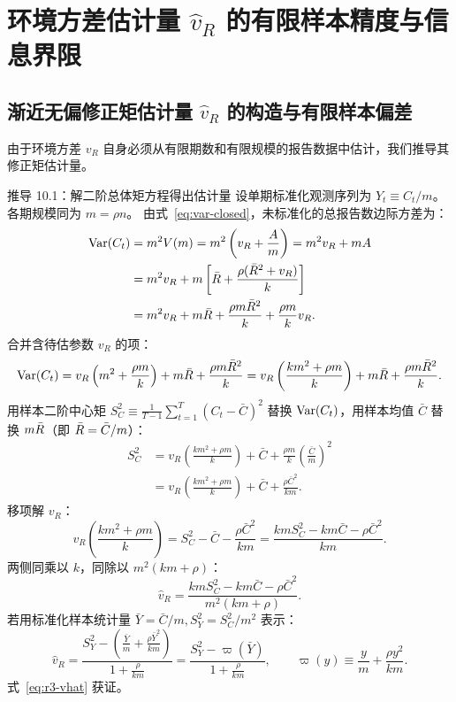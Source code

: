 \section{环境方差估计量 $\hat{v}_R$ 的有限样本精度与信息界限}
\label{sec:part10}

\subsection{渐近无偏修正矩估计量 $\hat{v}_R$ 的构造与有限样本偏差}

由于环境方差 $v_R$ 自身必须从有限期数和有限规模的报告数据中估计，我们推导其修正矩估计量。

\begin{derivationbox}{推导 10.1：解二阶总体矩方程得出估计量}
设单期标准化观测序列为 $Y_t \equiv C_t / m$。各期规模同为 $m = \rho n$。
由式~\eqref{eq:var-closed}，未标准化的总报告数边际方差为：
\begin{align}
  \mathrm{Var}(C_t) &= m^2 V(m) = m^2 \left( v_R + \frac{A}{m} \right) = m^2 v_R + m A \nonumber \\
  &= m^2 v_R + m \left[ \bar{R} + \frac{\rho(\bar{R}^2 + v_R)}{k} \right] \nonumber \\
  &= m^2 v_R + m \bar{R} + \frac{\rho m \bar{R}^2}{k} + \frac{\rho m}{k} v_R.
\end{align}
合并含待估参数 $v_R$ 的项：
\begin{equation}
  \mathrm{Var}(C_t) = v_R \left( m^2 + \frac{\rho m}{k} \right) + m \bar{R} + \frac{\rho m \bar{R}^2}{k} = v_R \left( \frac{k m^2 + \rho m}{k} \right) + m \bar{R} + \frac{\rho m \bar{R}^2}{k}.
\end{equation}
用样本二阶中心矩 $S_C^2 \equiv \frac{1}{T-1}\sum_{t=1}^T (C_t - \bar{C})^2$ 替换 $\mathrm{Var}(C_t)$，用样本均值 $\bar{C}$ 替换 $m\bar{R}$（即 $\bar{R} = \bar{C}/m$）：
\begin{align}
  S_C^2 &= v_R \left( \frac{k m^2 + \rho m}{k} \right) + \bar{C} + \frac{\rho m}{k} \left( \frac{\bar{C}}{m} \right)^2 \nonumber \\
  &= v_R \left( \frac{k m^2 + \rho m}{k} \right) + \bar{C} + \frac{\rho \bar{C}^2}{km}.
\end{align}
移项解 $v_R$：
\begin{equation}
  v_R \left( \frac{k m^2 + \rho m}{k} \right) = S_C^2 - \bar{C} - \frac{\rho \bar{C}^2}{km} = \frac{k m S_C^2 - k m \bar{C} - \rho \bar{C}^2}{km}.
\end{equation}
两侧同乘以 $k$，同除以 $m^2(km + \rho)$：
\begin{equation}
  \hat{v}_R = \frac{k m S_C^2 - k m \bar{C} - \rho \bar{C}^2}{m^2 (km + \rho)}.
  \label{eq:vhat-raw}
\end{equation}
若用标准化样本统计量 $\bar{Y} = \bar{C}/m, S_Y^2 = S_C^2 / m^2$ 表示：
\begin{equation}
  \hat{v}_R = \frac{S_Y^2 - \left( \frac{\bar{Y}}{m} + \frac{\rho \bar{Y}^2}{km} \right)}{1 + \frac{\rho}{km}} = \frac{S_Y^2 - \varpi(\bar{Y})}{1 + \frac{\rho}{km}}, \qquad \varpi(y) \equiv \frac{y}{m} + \frac{\rho y^2}{km}.
  \label{eq:r3-vhat}
\end{equation}
式~\eqref{eq:r3-vhat} 获证。


\end{derivationbox}
